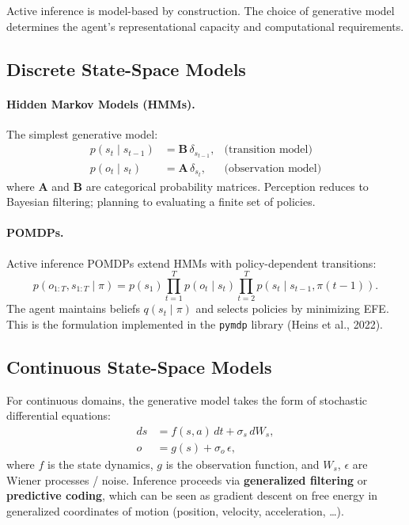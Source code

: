 \documentclass[11pt,a4paper]{article}
\theoremstyle{definition}
\begin{document}
Active inference is model-based by construction.  The choice of generative
model determines the agent's representational capacity and computational
requirements.

\subsection{Discrete State-Space Models}

\paragraph{Hidden Markov Models (HMMs).}
The simplest generative model:
\begin{align}
  p(s_t \mid s_{t-1}) &= \mathbf{B}\, \delta_{s_{t-1}},
  &\text{(transition model)} \\
  p(o_t \mid s_t) &= \mathbf{A}\, \delta_{s_t},
  &\text{(observation model)}
\end{align}
where $\mathbf{A}$ and $\mathbf{B}$ are categorical probability matrices.
Perception reduces to Bayesian filtering; planning to evaluating a finite set
of policies.

\paragraph{POMDPs.}
Active inference POMDPs extend HMMs with policy-dependent transitions:
\begin{equation}
  p(o_{1:T}, s_{1:T} \mid \pi) = p(s_1) \prod_{t=1}^{T} p(o_t \mid s_t)
  \prod_{t=2}^{T} p(s_t \mid s_{t-1}, \pi(t-1)).
\end{equation}
The agent maintains beliefs $q(s_t \mid \pi)$ and selects policies by
minimizing EFE.  This is the formulation implemented in the \texttt{pymdp}
library (Heins et al., 2022).

\subsection{Continuous State-Space Models}

For continuous domains, the generative model takes the form of stochastic
differential equations:
\begin{align}
  ds &= f(s, a)\, dt + \sigma_s\, dW_s, \\
  o &= g(s) + \sigma_o\, \epsilon,
\end{align}
where $f$ is the state dynamics, $g$ is the observation function, and $W_s$,
$\epsilon$ are Wiener processes / noise.  Inference proceeds via
\textbf{generalized filtering} or \textbf{predictive coding}, which can be
seen as gradient descent on free energy in generalized coordinates of motion
(position, velocity, acceleration, \ldots).
\end{document}
